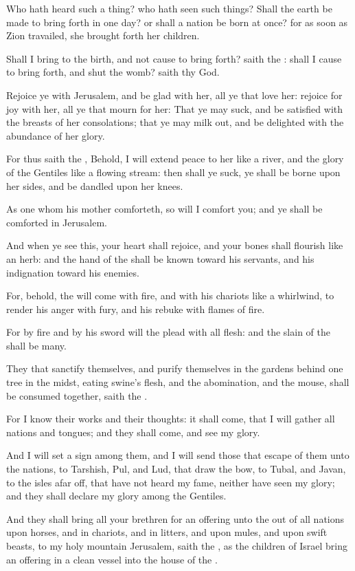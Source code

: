 \Verse Who hath heard such a thing? who hath seen such things? Shall the earth be made to bring forth in one day? or shall a nation be born at once?  for as soon as Zion travailed, she brought forth her children.

\Verse Shall I bring to the birth, and not cause to bring forth? saith the \LORD: shall I cause to bring forth, and shut the womb? saith thy God.

\Verse Rejoice ye with Jerusalem, and be glad with her, all ye that love her: rejoice for joy with her, all ye that mourn for her: \Verse That ye may suck, and be satisfied with the breasts of her consolations; that ye may milk out, and be delighted with the abundance of her glory.

\Verse For thus saith the \LORD, Behold, I will extend peace to her like a river, and the glory of the Gentiles like a flowing stream: then shall ye suck, ye shall be borne upon her sides, and be dandled upon her knees.

\Verse As one whom his mother comforteth, so will I comfort you; and ye shall be comforted in Jerusalem.

\Verse And when ye see this, your heart shall rejoice, and your bones shall flourish like an herb: and the hand of the \LORD shall be known toward his servants, and his indignation toward his enemies.

\Verse For, behold, the \LORD will come with fire, and with his chariots like a whirlwind, to render his anger with fury, and his rebuke with flames of fire.

\Verse For by fire and by his sword will the \LORD plead with all flesh: and the slain of the \LORD shall be many.

\Verse They that sanctify themselves, and purify themselves in the gardens behind one tree in the midst, eating swine's flesh, and the abomination, and the mouse, shall be consumed together, saith the \LORD.

\Verse For I know their works and their thoughts: it shall come, that I will gather all nations and tongues; and they shall come, and see my glory.

\Verse And I will set a sign among them, and I will send those that escape of them unto the nations, to Tarshish, Pul, and Lud, that draw the bow, to Tubal, and Javan, to the isles afar off, that have not heard my fame, neither have seen my glory; and they shall declare my glory among the Gentiles.

\Verse And they shall bring all your brethren for an offering unto the \LORD out of all nations upon horses, and in chariots, and in litters, and upon mules, and upon swift beasts, to my holy mountain Jerusalem, saith the \LORD, as the children of Israel bring an offering in a clean vessel into the house of the \LORD.

